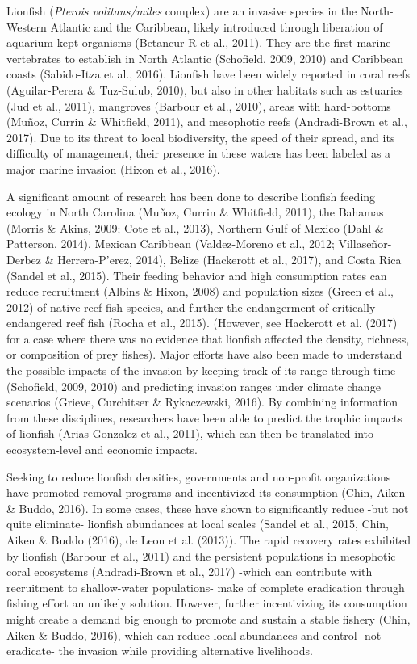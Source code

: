 \documentclass[12pt,]{article}
\begin{document}
Lionfish (\emph{Pterois volitans/miles} complex) are an invasive species
in the North-Western Atlantic and the Caribbean, likely introduced
through liberation of aquarium-kept organisms (Betancur-R et al., 2011).
They are the first marine vertebrates to establish in North Atlantic
(Schofield, 2009, 2010) and Caribbean coasts (Sabido-Itza et al., 2016).
Lionfish have been widely reported in coral reefs (Aguilar-Perera \&
Tuz-Sulub, 2010), but also in other habitats such as estuaries (Jud et
al., 2011), mangroves (Barbour et al., 2010), areas with hard-bottoms
(Muñoz, Currin \& Whitfield, 2011), and mesophotic reefs (Andradi-Brown
et al., 2017). Due to its threat to local biodiversity, the speed of
their spread, and its difficulty of management, their presence in these
waters has been labeled as a major marine invasion (Hixon et al., 2016).

A significant amount of research has been done to describe lionfish
feeding ecology in North Carolina (Muñoz, Currin \& Whitfield, 2011),
the Bahamas (Morris \& Akins, 2009; Cote et al., 2013), Northern Gulf of
Mexico (Dahl \& Patterson, 2014), Mexican Caribbean (Valdez-Moreno et
al., 2012; Villaseñor-Derbez \& Herrera-P\a'erez, 2014), Belize
(Hackerott et al., 2017), and Costa Rica (Sandel et al., 2015). Their
feeding behavior and high consumption rates can reduce recruitment
(Albins \& Hixon, 2008) and population sizes (Green et al., 2012) of
native reef-fish species, and further the endangerment of critically
endangered reef fish (Rocha et al., 2015). (However, see Hackerott et
al. (2017) for a case where there was no evidence that lionfish affected
the density, richness, or composition of prey fishes). Major efforts
have also been made to understand the possible impacts of the invasion
by keeping track of its range through time (Schofield, 2009, 2010) and
predicting invasion ranges under climate change scenarios (Grieve,
Curchitser \& Rykaczewski, 2016). By combining information from these
disciplines, researchers have been able to predict the trophic impacts
of lionfish (Arias-Gonzalez et al., 2011), which can then be translated
into ecosystem-level and economic impacts.

Seeking to reduce lionfish densities, governments and non-profit
organizations have promoted removal programs and incentivized its
consumption (Chin, Aiken \& Buddo, 2016). In some cases, these have
shown to significantly reduce -but not quite eliminate- lionfish
abundances at local scales (Sandel et al., 2015, Chin, Aiken \& Buddo
(2016), de Leon et al. (2013)). The rapid recovery rates exhibited by
lionfish (Barbour et al., 2011) and the persistent populations in
mesophotic coral ecosystems (Andradi-Brown et al., 2017) -which can
contribute with recruitment to shallow-water populations- make of
complete eradication through fishing effort an unlikely solution.
However, further incentivizing its consumption might create a demand big
enough to promote and sustain a stable fishery (Chin, Aiken \& Buddo,
2016), which can reduce local abundances and control -not eradicate- the
invasion while providing alternative livelihoods.
\end{document}
